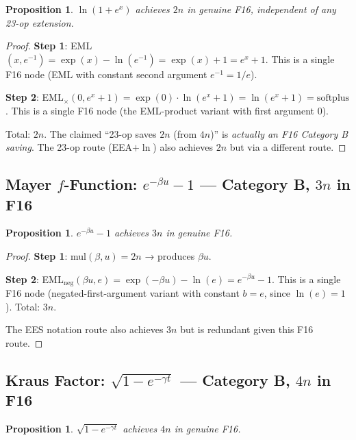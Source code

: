 \documentclass[11pt]{article}
\newtheorem{proposition}[theorem]{Proposition}
\begin{document}
\begin{proposition}
$\ln(1+e^x)$ achieves $2n$ in genuine F16, independent of any 23-op extension.
\end{proposition}

\begin{proof}
\textbf{Step 1}: EML$(x, e^{-1}) = \exp(x) - \ln(e^{-1}) = \exp(x) + 1 = e^x+1$.
This is a single F16 node (EML with constant second argument $e^{-1}=1/e$).

\textbf{Step 2}: EML$_\times(0, e^x+1) = \exp(0)\cdot\ln(e^x+1) = \ln(e^x+1) = \text{softplus}$.
This is a single F16 node (the EML-product variant with first argument $0$).

Total: $2n$. The claimed ``23-op saves $2n$ (from $4n$)'' is \emph{actually an F16 Category B saving}.
The 23-op route (EEA$+\ln$) also achieves $2n$ but via a different route.
\end{proof}

\subsection{Mayer $f$-Function: $e^{-\beta u}-1$ — Category B, $3n$ in F16}

\begin{proposition}
$e^{-\beta u}-1$ achieves $3n$ in genuine F16.
\end{proposition}

\begin{proof}
\textbf{Step 1}: mul$(\beta, u) = 2n$ → produces $\beta u$.

\textbf{Step 2}: EML$_{\mathrm{neg}}(\beta u, e) = \exp(-\beta u) - \ln(e) = e^{-\beta u} - 1$.
This is a single F16 node (negated-first-argument variant with constant $b=e$,
since $\ln(e)=1$). Total: $3n$.

The EES notation route also achieves $3n$ but is redundant given this F16 route.
\end{proof}

\subsection{Kraus Factor: $\sqrt{1-e^{-\gamma t}}$ — Category B, $4n$ in F16}

\begin{proposition}
$\sqrt{1-e^{-\gamma t}}$ achieves $4n$ in genuine F16.
\end{proposition}
\end{document}
